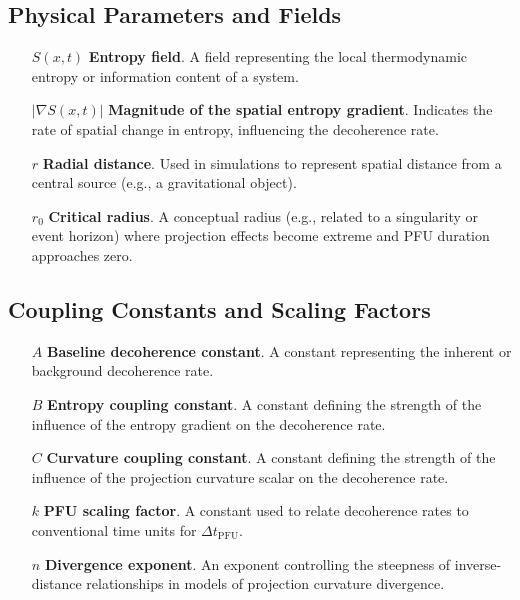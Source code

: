 \documentclass[12pt,a4paper]{article}
\numberwithin{equation}{section}
\begin{document}
\subsection{Physical Parameters and Fields}
\begin{itemize}
    \item[$S(x, t)$] \textbf{Entropy field}. A field representing the local thermodynamic entropy or information content of a system.
    \item[$|\nabla S(x, t)|$] \textbf{Magnitude of the spatial entropy gradient}. Indicates the rate of spatial change in entropy, influencing the decoherence rate.
    \item[$r$] \textbf{Radial distance}. Used in simulations to represent spatial distance from a central source (e.g., a gravitational object).
    \item[$r_0$] \textbf{Critical radius}. A conceptual radius (e.g., related to a singularity or event horizon) where projection effects become extreme and PFU duration approaches zero.
\end{itemize}

\subsection{Coupling Constants and Scaling Factors}
\begin{itemize}
    \item[$A$] \textbf{Baseline decoherence constant}. A constant representing the inherent or background decoherence rate.
    \item[$B$] \textbf{Entropy coupling constant}. A constant defining the strength of the influence of the entropy gradient on the decoherence rate.
    \item[$C$] \textbf{Curvature coupling constant}. A constant defining the strength of the influence of the projection curvature scalar on the decoherence rate.
    \item[$k$] \textbf{PFU scaling factor}. A constant used to relate decoherence rates to conventional time units for $\Delta t_{\text{PFU}}$.
    \item[$n$] \textbf{Divergence exponent}. An exponent controlling the steepness of inverse-distance relationships in models of projection curvature divergence.
\end{itemize}
\end{document}
